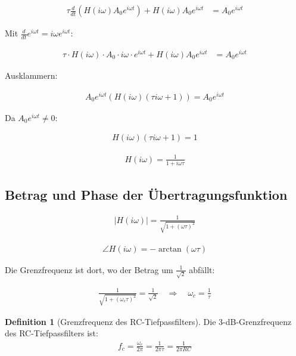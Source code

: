 \documentclass[a4paper,12pt,twoside]{report}
\theoremstyle{definition}
\newtheorem{definition}{Definition}
\begin{document}
\begin{align}
	\tau \frac{d}{dt}(H(i\omega) A_0 e^{i\omega t}) + H(i\omega) A_0 e^{i\omega t} &= A_0 e^{i\omega t}
\end{align}

Mit $\frac{d}{dt} e^{i\omega t} = i\omega e^{i\omega t}$:

\begin{align}
	\tau \cdot H(i\omega) \cdot A_0 \cdot i\omega \cdot e^{i\omega t} + H(i\omega) A_0 e^{i\omega t} &= A_0 e^{i\omega t}
\end{align}

Ausklammern:

\begin{align}
	A_0 e^{i\omega t} (H(i\omega)(\tau i\omega + 1)) = A_0 e^{i\omega t}
\end{align}

Da $A_0 e^{i\omega t} \neq 0$:

\begin{align}
	H(i\omega) (\tau i\omega + 1) = 1
\end{align}

\begin{align}
	H(i\omega) = \frac{1}{1 + i\omega\tau}
\end{align}

\subsection{Betrag und Phase der Übertragungsfunktion}

\begin{align}
	|H(i\omega)| = \frac{1}{\sqrt{1 + (\omega\tau)^2}}
\end{align}

\begin{align}
	\angle H(i\omega) = -\arctan(\omega\tau)
\end{align}

Die Grenzfrequenz ist dort, wo der Betrag um $\frac{1}{\sqrt{2}}$ abfällt:

\begin{align}
	\frac{1}{\sqrt{1 + (\omega_c\tau)^2}} = \frac{1}{\sqrt{2}} \quad \Rightarrow \quad \omega_c = \frac{1}{\tau}
\end{align}

\begin{definition}[Grenzfrequenz des RC-Tiefpassfilters]
	Die 3-dB-Grenzfrequenz des RC-Tiefpassfilters ist:
	\begin{align}
		f_c = \frac{\omega_c}{2\pi} = \frac{1}{2\pi\tau} = \frac{1}{2\pi RC}
	\end{align}
\end{definition}
\end{document}
